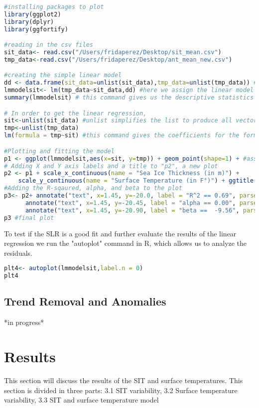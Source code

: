 \documentclass{article}
\begin{document}
\begin{lstlisting}[language=R]
#installing packages to plot
library(ggplot2)
library(dplyr)
library(ggfortify)

#reading in the csv files
sit_data<- read.csv("/Users/fridaperez/Desktop/sit_mean.csv")
tmp_data<-read.csv("/Users/fridaperez/Desktop/ant_mean_new.csv")

#creating the simple linear model
dd <- data.frame(sit_data=unlist(sit_data),tmp_data=unlist(tmp_data)) #making a data frame with the two data sets
lmmodelsit<- lm(tmp_data~sit_data,dd) #here we assign the linear model to "lmmodelsit"
summary(lmmodelsit) # this command gives us the descriptive statistics

# In order to get the linear regression, 
sit<-unlist(sit_data) #unlist simplifies the list to produce all vectors
tmp<-unlist(tmp_data)
lm(formula = tmp~sit) #this command gives the coefficients for the formula 

#Plotting and fitting the model 
p1 <- ggplot(lmmodelsit,aes(x=sit, y=tmp)) + geom_point(shape=1) + #assigning lm to "p1" geom_smooth(method=lm)
# Adding X and Y axis labels and a title to "p2", a new plot
p2 <- p1 + scale_x_continuous(name = "Sea Ice Thickness (in m)") +
    scale_y_continuous(name = "Surface Temperature (in F°)") + ggtitle("Surface Temperature Regression Line") 
#Adding the R-sqaured, alpha, and beta to the plot
p3<- p2+ annotate("text", x=1.45, y=-20.0, label = "R^2 == 0.69", parse=T) +
      annotate("text", x=1.45, y=-20.45, label = "alpha == 0.00", parse=T) +
      annotate("text", x=1.45, y=-20.90, label = "beta ==  -9.56", parse=T)
p3 #final plot
\end{lstlisting}

To test if the SLR is a good fit and further evaluate the results of the linear regression we run the "autoplot" command in R, which allows us to analyze the residuals.
\begin{lstlisting}[language=R]
plt4<- autoplot(lmmodelsit,label.n = 0) 
plt4
\end{lstlisting}


\subsection{Trend Removal and Anomalies}
*in progress*


\section{Results}
This section will discuss the results of the SIT and surface temperatures. This section is divided in three parts: 3.1 SIT variability, 3.2 Surface temperature variability, 3.3 SIT and surface temperature model 
\end{document}
